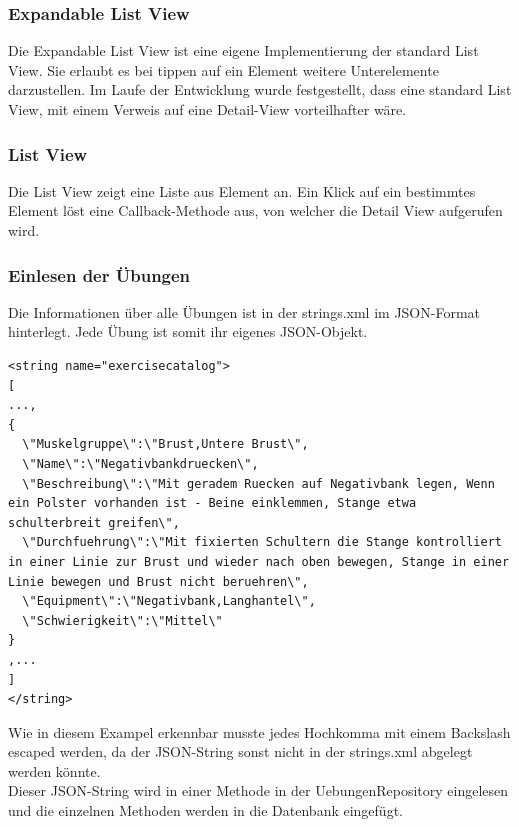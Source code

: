 \documentclass[FIPLY_base.tex]{subfiles}
\begin{document}
\subsubsection{Expandable List View}
Die Expandable List View ist eine eigene Implementierung der standard List View. Sie erlaubt es bei tippen auf ein Element weitere Unterelemente darzustellen.
Im Laufe der Entwicklung wurde festgestellt, dass eine standard List View, mit einem Verweis auf eine Detail-View vorteilhafter wäre.

\subsubsection{List View}
Die List View zeigt eine Liste aus Element an. Ein Klick auf ein bestimmtes Element löst eine Callback-Methode aus, von welcher die Detail View aufgerufen wird.
\newpage
\subsubsection{Einlesen der Übungen}
Die Informationen über alle Übungen ist in der strings.xml im JSON-Format hinterlegt.
Jede Übung ist somit ihr eigenes JSON-Objekt. 

\begin{lstlisting}
<string name="exercisecatalog">
[
...,
{
  \"Muskelgruppe\":\"Brust,Untere Brust\",
  \"Name\":\"Negativbankdruecken\",
  \"Beschreibung\":\"Mit geradem Ruecken auf Negativbank legen, Wenn ein Polster vorhanden ist - Beine einklemmen, Stange etwa schulterbreit greifen\",
  \"Durchfuehrung\":\"Mit fixierten Schultern die Stange kontrolliert in einer Linie zur Brust und wieder nach oben bewegen, Stange in einer Linie bewegen und Brust nicht beruehren\",
  \"Equipment\":\"Negativbank,Langhantel\",
  \"Schwierigkeit\":\"Mittel\"
}
,...
]
</string>
\end{lstlisting}
Wie in diesem Exampel erkennbar musste jedes Hochkomma mit einem Backslash escaped werden, da der JSON-String sonst nicht in der strings.xml abgelegt werden könnte.
\newpage
\ \\
Dieser JSON-String wird in einer Methode in der UebungenRepository eingelesen und die einzelnen Methoden werden in die Datenbank eingefügt.
\end{document}
